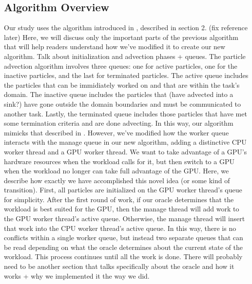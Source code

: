 \documentclass{IEEEtran}
\begin{document}
\subsection{Algorithm Overview}
Our study uses the algorithm introduced in \cite{Camp13}, described in section 2. (fix reference later)
%
Here, we will discuss only the important parts of the previous algorithm that will help readers understand how we've modified it to create our new algorithm.
%
Talk about initialization and advection phases + queues.
%
The particle advection algorithm involves three queues: one for active particles, one for the inactive particles, and the last for terminated particles.
%
The active queue includes the particles that can be immidiately worked on and that are within the task's domain.
%
The inactive queue includes the particles that (have advected into a sink?) have gone outside the domain boundaries and must be communicated to another task.
%
Lastly, the terminated queue includes those particles that have met some termination criteria and are done advecting.
%
In this way, our algorithm mimicks that described in \cite{Camp13}.
%
However, we've modified how the worker queue interacts with the manage queue in our new algorithm, adding a distinctive CPU worker thread and a GPU worker thread. 
%
We want to take advantage of a GPU's hardware resources when the workload calls for it, but then switch to a GPU when the workload no longer can take full advantage of the GPU.
%
Here, we describe how exactly we have accomplished this novel idea (or some kind of transition).
%
First, all particles are initialized on the GPU worker thread's queue for simplicity.
%
After the first round of work, if our oracle determines that the workload is best suited for the GPU, then the manage thread will add work to the GPU worker thread's active queue.
%
Otherwise, the manage thread will insert that work into the CPU worker thread's active queue.
%
In this way, there is no conflicts within a single worker queue, but instead two separate queues that can be read depending on what the oracle determines about the current state of the workload.
%
This process continues until all the work is done.
%
There will probably need to be another section that talks specifically about the oracle and how it works + why we implemented it the way we did.
%
\end{document}
